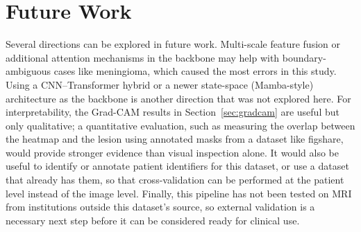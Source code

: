 \documentclass[conference]{IEEEtran}
\begin{document}
\section{Future Work}
Several directions can be explored in future work. Multi-scale feature fusion or additional attention mechanisms in the backbone may help with boundary-ambiguous cases like meningioma, which caused the most errors in this study. Using a CNN--Transformer hybrid or a newer state-space (Mamba-style) architecture as the backbone is another direction that was not explored here. For interpretability, the Grad-CAM results in Section~\ref{sec:gradcam} are useful but only qualitative; a quantitative evaluation, such as measuring the overlap between the heatmap and the lesion using annotated masks from a dataset like figshare, would provide stronger evidence than visual inspection alone. It would also be useful to identify or annotate patient identifiers for this dataset, or use a dataset that already has them, so that cross-validation can be performed at the patient level instead of the image level. Finally, this pipeline has not been tested on MRI from institutions outside this dataset's source, so external validation is a necessary next step before it can be considered ready for clinical use.



\end{document}

